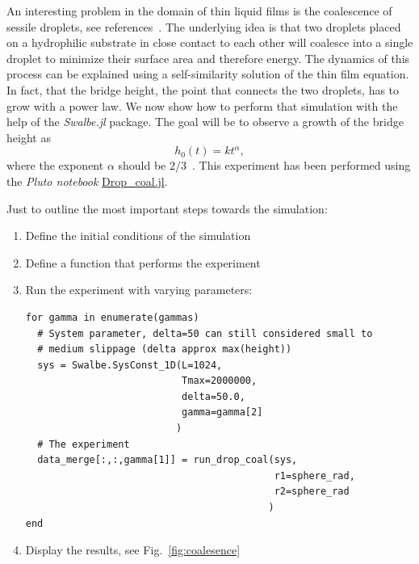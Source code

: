 An interesting problem in the domain of thin liquid films is the coalescence of sessile droplets, see references~\cite{eggers1999coalescence, PhysRevLett.111.144502, PhysRevLett.109.184502, PhysRevLett.95.164503}.
The underlying idea is that two droplets placed on a hydrophilic substrate in close contact to each other will coalesce into a single droplet to minimize their surface area and therefore energy.
The dynamics of this process can be explained using a self-similarity solution of the thin film equation.
In fact, that the bridge height, the point that connects the two droplets, has to grow with a power law.
We now show how to perform that simulation with the help of the \textit{Swalbe.jl} package.
The goal will be to observe a growth of the bridge height as 
\begin{equation}\label{eq:powerlaw}
    h_0(t) = k t^{\alpha},
\end{equation}
where the exponent $\alpha$ should be $2/3$~\cite{doi:10.1063/1.5119014, doi:10.1063/1.4824108}.
This experiment has been performed using the \textit{Pluto notebook} \href{https://jugit.fz-juelich.de/compflu/swalbe.jl/-/blob/JOSS/scripts/Drop_coal.jl}{Drop\_coal.jl}.

Just to outline the most important steps towards the simulation:
\begin{enumerate}
\item Define the initial conditions of the simulation
\item Define a function that performs the experiment
\item Run the experiment with varying parameters:
\begin{verbatim}
for gamma in enumerate(gammas)
  # System parameter, delta=50 can still considered small to  
  # medium slippage (delta approx max(height))
  sys = Swalbe.SysConst_1D(L=1024, 
                           Tmax=2000000, 
                           delta=50.0, 
                           gamma=gamma[2]
                          )
  # The experiment
  data_merge[:,:,gamma[1]] = run_drop_coal(sys, 
                                           r1=sphere_rad, 
                                           r2=sphere_rad
                                          )
end
\end{verbatim}
\item Display the results, see Fig.~\ref{fig:coalesence} 
\end{enumerate}


